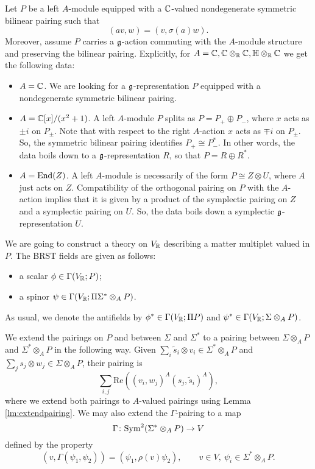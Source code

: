 \documentclass[10pt, oneside]{article}
\renewcommand{\Re}{\mathrm{Re}}
\begin{document}
Let $P$ be a left $A$-module equipped with a $\mathbb C$-valued nondegenerate symmetric bilinear pairing such that
\[(av, w) = (v, \sigma(a)w).\]
Moreover, assume $P$ carries a $\mathfrak g$-action commuting with the $A$-module structure and preserving the bilinear pairing. Explicitly, for $A=\mathbb C, \mathbb C\otimes_\mathbb R\mathbb C, \mathbb{H}\otimes_\mathbb R\mathbb C$ we get the following data:
\begin{itemize}
\item $A=\mathbb C$. We are looking for a $\mathfrak g$-representation $P$ equipped with a nondegenerate symmetric bilinear pairing.

\item $A=\mathbb C[x]/(x^2+1)$. A left $A$-module $P$ splits as $P=P_+\oplus P_-$, where $x$ acts as $\pm i$ on $P_{\pm}$. Note that with respect to the right $A$-action $x$ acts as $\mp i$ on $P_{\pm}$. So, the symmetric bilinear pairing identifies $P_+\cong P_-^*$. In other words, the data boils down to a $\mathfrak g$-representation $R$, so that $P = R\oplus R^*$.

\item $A=\operatorname{End}(Z)$. A left $A$-module is necessarily of the form $P\cong Z\otimes U$, where $A$ just acts on $Z$. Compatibility of the orthogonal pairing on $P$ with the $A$-action implies that it is given by a product of the symplectic pairing on $Z$ and a symplectic pairing on $U$. So, the data boils down a symplectic $\mathfrak g$-representation $U$.
\end{itemize}

We are going to construct a theory on $V_\mathbb R$ describing a matter multiplet valued in $P$. The BRST fields are given as follows:
\begin{itemize}
\item a scalar $\phi\in\Gamma(V_\mathbb R; P)$;
\item a spinor $\psi\in\Gamma(V_\mathbb R; \Pi \Sigma^*\otimes_A P)$.
\end{itemize}
As usual, we denote the antifields by $\phi^*\in\Gamma(V_\mathbb R; \Pi P)$ and $\psi^*\in\Gamma(V_\mathbb R; \Sigma\otimes_A P)$.

We extend the pairings on $P$ and between $\Sigma$ and $\Sigma^*$ to a pairing between $\Sigma\otimes_A P$ and $\Sigma^*\otimes_A P$ in the following way. Given $\sum_i \tilde{s}_i\otimes v_i\in \Sigma^*\otimes_A P$ and $\sum_j s_j\otimes w_j\in\Sigma\otimes_A P$, their pairing is
\begin{equation}
\sum_{i, j} \Re((v_i, w_j)^A (s_j, \tilde{s}_i)^A),
\label{eq:spinorialmatterpairing}
\end{equation}
where we extend both pairings to $A$-valued pairings using Lemma \ref{lm:extendpairing}. We may also extend the $\Gamma$-pairing to a map
\[\Gamma\colon {\rm Sym}^2(\Sigma^*\otimes_A P)\rightarrow V\]
defined by the property
\[(v, \Gamma(\psi_1, \psi_2)) = (\psi_1, \rho(v) \psi_2),\qquad v\in V,\ \psi_i\in \Sigma^*\otimes_A P.\]
\end{document}
